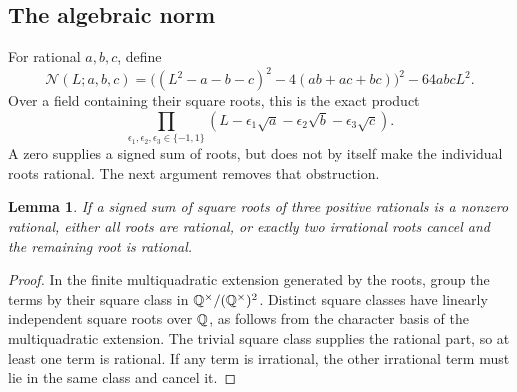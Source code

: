 \documentclass[11pt,letterpaper]{article}
\newtheorem{lemma}[theorem]{Lemma}
\theoremstyle{remark}\newtheorem{remark}[theorem]{Remark}
\begin{document}
\subsection{The algebraic norm}
For rational $a,b,c$, define
\begin{equation}\label{eq:norm3}
 \mathscr N(L;a,b,c)
 =\bigl((L^2-a-b-c)^2-4(ab+ac+bc)\bigr)^2-64abcL^2.
\end{equation}
Over a field containing their square roots, this is the exact product
\[
 \prod_{\epsilon_1,\epsilon_2,\epsilon_3\in\{-1,1\}}
 (L-\epsilon_1\sqrt a-\epsilon_2\sqrt b-\epsilon_3\sqrt c).
\]
A zero supplies a signed sum of roots, but does not by itself make the
individual roots rational. The next argument removes that obstruction.

\begin{lemma}\label{lem:classes}
If a signed sum of square roots of three positive rationals is a nonzero
rational, either all roots are rational, or exactly two irrational roots
cancel and the remaining root is rational.
\end{lemma}
\begin{proof}
In the finite multiquadratic extension generated by the roots, group the
terms by their square class in $\mathbb Q^\times/(\mathbb Q^\times)^2$.
Distinct square classes have linearly independent square roots over $\mathbb Q$,
as follows from the character basis of the multiquadratic extension.
The trivial square class supplies the rational part, so at least one
term is rational. If any term is irrational, the other irrational term
must lie in the same class and cancel it.
\end{proof}
\end{document}
